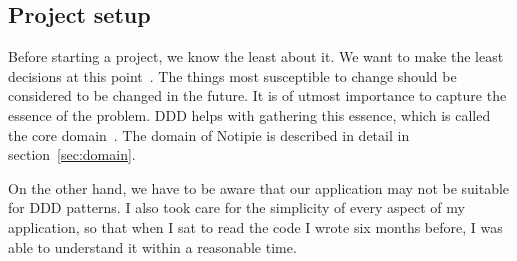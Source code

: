 \subsection{Project setup}\label{sec:project-setup}

Before starting a project,
we know the least about it.
We want to make the least decisions
at this point~\cite{beck_extreme_2004}.
The things most susceptible to change
should be considered to be changed in the future.
It is of utmost importance to capture
the essence of the problem.
\Ac{DDD} helps with
gathering this essence,
which is called
the core domain~\cite{millett_patterns_2015}.
The domain of Notipie is described in detail
in section~\ref{sec:domain}.

On the other hand,
we have to be aware that our application
may not be suitable for \ac{DDD} patterns.
I also took care for the simplicity
of every aspect of my application,
so that when I sat to read the code
I wrote six months before,
I was able to understand it
within a reasonable time.
